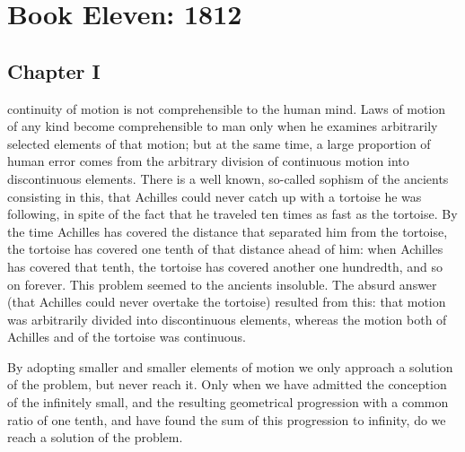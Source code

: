 \part*{Book Eleven: 1812}


\chapter*{Chapter I} \ifaudio {}
\fi

 continuity of motion is not comprehensible to the human
mind.  Laws of motion of any kind become comprehensible to man
only when he examines arbitrarily selected elements of that
motion; but at the same time, a large proportion of human error
comes from the arbitrary division of continuous motion into
discontinuous elements. There is a well known, so-called sophism
of the ancients consisting in this, that Achilles could never
catch up with a tortoise he was following, in spite of the fact
that he traveled ten times as fast as the tortoise. By the time
Achilles has covered the distance that separated him from the
tortoise, the tortoise has covered one tenth of that distance
ahead of him: when Achilles has covered that tenth, the tortoise
has covered another one hundredth, and so on forever. This
problem seemed to the ancients insoluble. The absurd answer (that
Achilles could never overtake the tortoise) resulted from this:
that motion was arbitrarily divided into discontinuous elements,
whereas the motion both of Achilles and of the tortoise was
continuous.

By adopting smaller and smaller elements of motion we only
approach a solution of the problem, but never reach it. Only when
we have admitted the conception of the infinitely small, and the
resulting geometrical progression with a common ratio of one
tenth, and have found the sum of this progression to infinity, do
we reach a solution of the problem.

